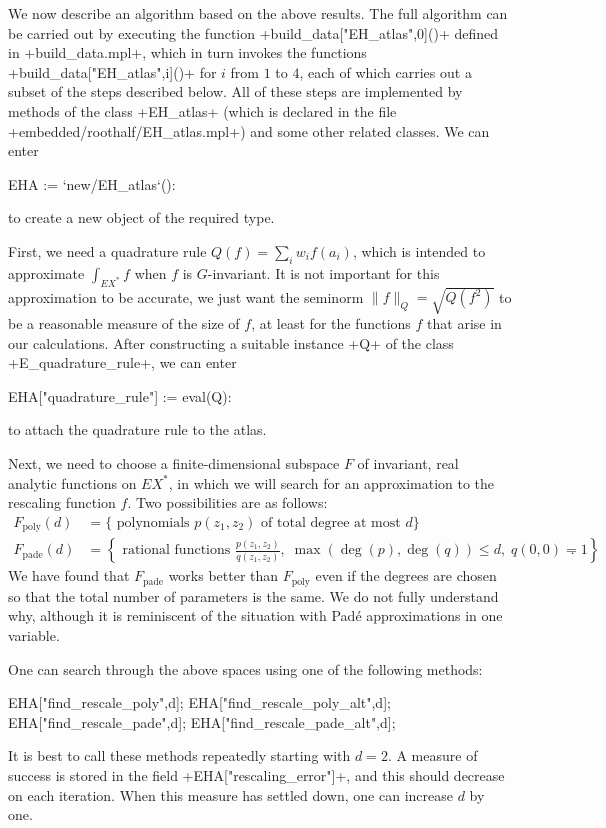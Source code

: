 \documentclass[reqno]{amsart}
\renewcommand{\:}{\colon}
\theoremstyle{definition}
\begin{document}
We now describe an algorithm based on the above results.  The full
algorithm can be carried out by executing the function
\mcode+build_data["EH_atlas",0]()+ defined in \mcode+build_data.mpl+,
which in turn invokes the functions \mcode+build_data["EH_atlas",i]()+
for $i$ from $1$ to $4$, each of which carries out a subset of the
steps described below.  All of these steps are implemented by methods
of the class \mcode+EH_atlas+ (which is declared in the file
\fname+embedded/roothalf/EH_atlas.mpl+) and some other related
classes.  We can enter 
\begin{mcodeblock}
 EHA := `new/EH_atlas`():
\end{mcodeblock}
to create a new object of the required type.

First, we need a quadrature rule $Q(f)=\sum_iw_if(a_i)$,
which is intended to approximate $\int_{EX^*}f$ when $f$ is
$G$-invariant.  It is not important for this approximation to be
accurate, we just want the seminorm $\|f\|_Q=\sqrt{Q(f^2)}$ to be a
reasonable measure of the size of $f$, at least for the functions $f$
that arise in our calculations.  After constructing a suitable
instance \mcode+Q+ of the class \mcode+E_quadrature_rule+, we can
enter
\begin{mcodeblock}
 EHA["quadrature_rule"] := eval(Q):
\end{mcodeblock}
to attach the quadrature rule to the atlas.

Next, we need to choose a finite-dimensional subspace $F$ of
invariant, real analytic functions on $EX^*$, in which we will search
for an approximation to the rescaling function $f$.  Two possibilities
are as follows:
\begin{align*}
 F_{\text{poly}}(d) &=
  \{\text{ polynomials } p(z_1,z_2)
     \text{ of total degree at most } d\} \\
 F_{\text{pade}}(d) &=
  \left\{\text{ rational functions } \frac{p(z_1,z_2)}{q(z_1,z_2)},\;
     \max(\deg(p),\deg(q)) \leq d,\; q(0,0)=1\right\}.
\end{align*}
We have found that $F_{\text{pade}}$ works better than
$F_{\text{poly}}$ even if the degrees are chosen so that the total
number of parameters is the same.  We do not fully understand why,
although it is reminiscent of the situation with Pad\'e approximations
in one variable.

One can search through the above spaces using one of the following
methods:
\begin{mcodeblock}
 EHA["find_rescale_poly",d];
 EHA["find_rescale_poly_alt",d];
 EHA["find_rescale_pade",d];
 EHA["find_rescale_pade_alt",d];
\end{mcodeblock}
It is best to call these methods repeatedly starting with $d=2$.  A
measure of success is stored in the field
\mcode+EHA["rescaling_error"]+, and this should decrease on each
iteration.  When this measure has settled down, one can increase $d$
by one.
\end{document}
